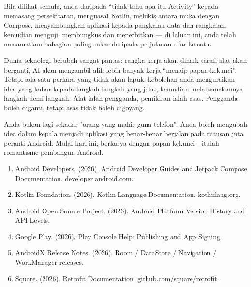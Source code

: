 Bila dilihat semula, anda daripada “tidak tahu apa itu Activity” kepada memasang persekitaran, menguasai Kotlin, melukis antara muka dengan Compose, menyambungkan aplikasi kepada pangkalan data dan rangkaian, kemudian menguji, membungkus dan menerbitkan — di laluan ini, anda telah menamatkan bahagian paling sukar daripada perjalanan sifar ke satu.

Dunia teknologi berubah sangat pantas: rangka kerja akan dinaik taraf, alat akan berganti, AI akan mengambil alih lebih banyak kerja “menaip papan kekunci”. Tetapi ada satu perkara yang tidak akan lapuk: kebolehan anda menguraikan idea yang kabar kepada langkah-langkah yang jelas, kemudian melaksanakannya langkah demi langkah. Alat ialah pengganda, pemikiran ialah asas. Pengganda boleh diganti, tetapi asas tidak boleh digoyang.

Anda bukan lagi sekadar "orang yang mahir guna telefon". Anda boleh mengubah idea dalam kepala menjadi aplikasi yang benar-benar berjalan pada ratusan juta peranti Android. Mulai hari ini, berkarya dengan papan kekunci—itulah romantisme pembangun Android.


\begin{enumerate}
  \item Android Developers. (2026). Android Developer Guides and Jetpack Compose Documentation. developer.android.com.
  \item Kotlin Foundation. (2026). Kotlin Language Documentation. kotlinlang.org.
  \item Android Open Source Project. (2026). Android Platform Version History and API Levels.
  \item Google Play. (2026). Play Console Help: Publishing and App Signing.
  \item AndroidX Release Notes. (2026). Room / DataStore / Navigation / WorkManager releases.
  \item Square. (2026). Retrofit Documentation. github.com/square/retrofit.
\end{enumerate}
